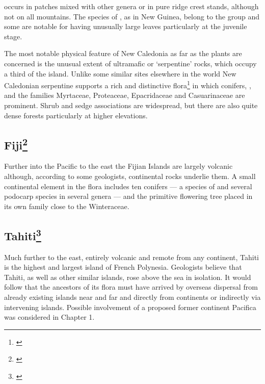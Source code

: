  occurs in patches mixed with other genera or in pure ridge crest stands, although not on all mountains.
The species of , as in New Guinea, belong to the  group and some are notable for having unusually large leaves particularly at the juvenile stage.

The most notable physical feature of New Caledonia as far as the plants are concerned is the unusual extent of ultramafic or `serpentine' rocks, which occupy a third of the island.
Unlike some similar sites elsewhere in the world New Caledonian serpentine supports a rich and distinctive flora\footnote{\cite{moratph1986affinites}} in which conifers, , and the families Myrtaceae, Proteaceae, Epacridaceae and Casuarinaceae are prominent.
Shrub and sedge associations are widespread, but there are also quite dense forests particularly at higher elevations.

\subsection[Fiji]{Fiji\footnote{\cite{carlquist1965island}}}

Further into the Pacific to the east the Fijian Islands are largely volcanic although, according to some geologists, continental rocks underlie them.
A small continental element in the flora includes ten conifers — a species of  and several podocarp species in several genera — and the primitive flowering tree  placed in its own family close to the Winteraceae.

\subsection[Tahiti]{Tahiti\footnote{\cite{carlquist1965island}}}

Much further to the east, entirely volcanic and remote from any continent, Tahiti is the highest and largest island of French Polynesia.
Geologists believe that Tahiti, as well as other similar islands, rose above the sea in isolation.
It would follow that the ancestors of its flora must have arrived by overseas dispersal from already existing islands near and far and directly from continents or indirectly via intervening islands.
Possible involvement of a proposed former continent Pacifica was considered in Chapter 1.

